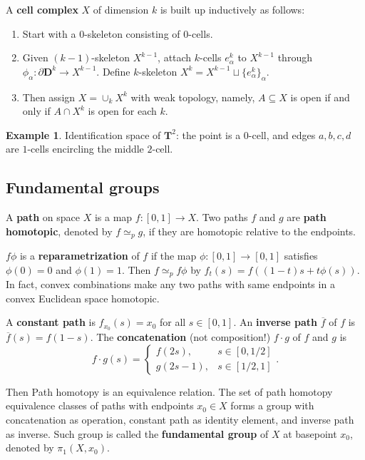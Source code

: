 \documentclass[11pt]{article}
\theoremstyle{definition}
\newtheorem*{example}{Example}
\theoremstyle{plain}
\theoremstyle{remark}
\newcommand{\D}{\mathbf{D}}
\begin{document}
A \textbf{cell complex} $X$ of dimension $k$ is built up inductively as follows:\begin{enumerate}
    \item Start with a $0$-skeleton consisting of $0$-cells.
    \item Given $(k-1)$-skeleton $X^{k-1}$, attach $k$-cells $e^k_\alpha$ to $X^{k-1}$ through $\phi_\alpha:\partial\D^k\to X^{k-1}$. Define $k$-skeleton $X^k=X^{k-1}\sqcup\{e^k_\alpha\}_\alpha$.
    \item Then assign $X=\cup_kX^k$ with weak topology, namely, $A\subseteq X$ is open if and only if $A\cap X^k$ is open for each $k$.
\end{enumerate}
\begin{example}
Identification space of $\mathbf{T}^2$: the point is a $0$-cell, and edges $a,b,c,d$ are $1$-cells encircling the middle $2$-cell.
\end{example} 

\subsection{Fundamental groups}\label{3}

A \textbf{path} on space $X$ is a map $f:[0,1]\to X$. Two paths $f$ and $g$ are \textbf{path homotopic}, denoted by $f\simeq_pg$, if they are homotopic relative to the endpoints.\medbreak

$f\phi$ is a \textbf{reparametrization} of $f$ if the map $\phi:[0,1]\to[0,1]$ satisfies $\phi(0)=0$ and $\phi(1)=1$. Then $f\simeq_p f\phi$ by $f_t(s)=f((1-t)s+t\phi(s))$. In fact, convex combinations make any two paths with same endpoints in a convex Euclidean space homotopic.\medbreak

A \textbf{constant path} is $f_{x_0}(s)=x_0$ for all $s\in[0,1]$. An \textbf{inverse path} $\overline{f}$ of $f$ is $\overline{f}(s)=f(1-s)$. The \textbf{concatenation} (not composition!) $f\cdot g$ of $f$ and $g$ is
\[f\cdot g(s)=\begin{cases}
f(2s),&s\in[0,1/2]\\g(2s-1),&s\in[1/2,1]
\end{cases}.\]\medbreak

Then Path homotopy is an equivalence relation. The set of path homotopy equivalence classes of paths with endpoints $x_0\in X$ forms a group with concatenation as operation, constant path as identity element, and inverse path as inverse. Such group is called the \textbf{fundamental group} of $X$ at basepoint $x_0$, denoted by $\pi_1(X,x_0)$.\medbreak
\end{document}
